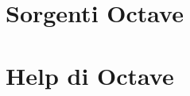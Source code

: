 \documentclass[10pt, a4paper]{report}
\begin{document}
\chapter{Sorgenti Octave}







\chapter*{Help di Octave}


\end{document}
